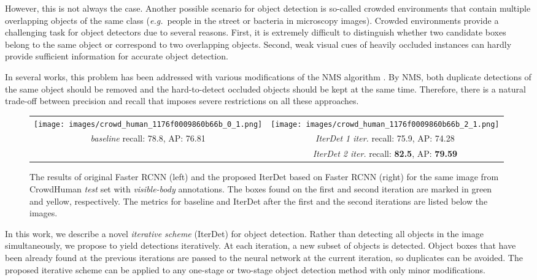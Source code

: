 \documentclass[runningheads]{llncs}
\newcommand{\eg}{\emph{e.g.}\ }
\begin{document}
However, this is not always the case. Another possible scenario for object detection is so-called crowded environments that contain multiple overlapping objects of the same class (\eg people in the street or bacteria in microscopy images). Crowded environments provide a challenging task for object detectors due to several reasons. First, it is extremely difficult to distinguish whether two candidate boxes belong to the same object or correspond to two overlapping objects. Second, weak visual cues of heavily occluded instances can hardly provide sufficient information for accurate object detection.

In several works, this problem has been addressed with various modifications of the NMS algorithm \cite{rothe2014non,bodla2017soft,hosang2017learning,tychsen2018improving,liu2019adaptive,huang2020nms}. By NMS, both duplicate detections of the same object should be removed and the hard-to-detect occluded objects should be kept at the same time. Therefore, there is a natural trade-off between precision and recall that imposes severe restrictions on all these approaches. 

\begin{figure*}[t]
\centering
\begin{tabular}{cc}
    \texttt{[image: images/crowd\_human\_1176f0009860b66b\_0\_1.png]} &
    \texttt{[image: images/crowd\_human\_1176f0009860b66b\_2\_1.png]} \\
    {\small \emph{baseline} recall: 78.8, AP: 76.81} & {\small \emph{IterDet 1 iter.} recall: 75.9, AP: 74.28} \\
    & {\small \emph{IterDet 2 iter.} recall: \textbf{82.5}, AP: \textbf{79.59}}
\end{tabular}
\caption{The results of original Faster RCNN (left) and the proposed IterDet based on Faster RCNN (right) for the same image from CrowdHuman \emph{test} set with \emph{visible-body} annotations. The boxes found on the first and second iteration are marked in green and yellow, respectively. The metrics for baseline and IterDet after the first and the second iterations are listed below the images.}
\label{fig:teaser}
\end{figure*}

In this work, we describe a novel \emph{iterative scheme} (IterDet) for object detection. Rather than detecting all objects in the image simultaneously, we propose to yield detections iteratively. At each iteration, a new subset of objects is detected. Object boxes that have been already found at the previous iterations are passed to the neural network at the current iteration, so duplicates can be avoided. The proposed iterative scheme can be applied to any one-stage or two-stage object detection method with only minor modifications.
\end{document}
